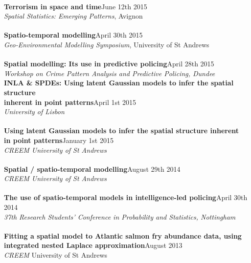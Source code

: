 \documentclass[10pt,letter]{article}
\begin{document}
 \hdashrule[0.5ex]{4cm}{1pt}{1pt}\\
{\textbf{Terrorism in space and time}}\hfill June 12th 2015\\
 {\sl Spatial Statistics: Emerging Patterns}, Avignon\\
 \hdashrule[0.5ex]{4cm}{1pt}{1pt}\\
 {\textbf{Spatio-temporal modelling}}\hfill April 30th 2015\\
 {\sl Geo-Environmental Modelling Symposium}, University of St Andrews\\
 \hdashrule[0.5ex]{4cm}{1pt}{1pt}\\
{\textbf{Spatial modelling: Its use in predictive policing}}\hfill April 28th 2015\\
{\sl Workshop on Crime Pattern Analysis and Predictive Policing, Dundee}\\
{\textbf{INLA \& SPDEs: Using latent Gaussian models to infer the spatial structure \\
inherent in point patterns}}\hfill April 1st 2015\\
 {\sl University of Lisbon}\\
 \hdashrule[0.5ex]{4cm}{1pt}{1pt}\\
 {\textbf{Using latent Gaussian models to infer the spatial
structure inherent \\in point patterns}}\hfill January 1st 2015\\
 {\sl CREEM University of St Andrews}\\
 \hdashrule[0.5ex]{4cm}{1pt}{1pt}\\
 {\textbf{Spatial / spatio-temporal modelling}}\hfill August 29th 2014\\
 {\sl CREEM University of St Andrews}\\
 \hdashrule[0.5ex]{4cm}{1pt}{1pt}\\
{\textbf{The use of spatio-temporal models in intelligence-led policing}}\hfill  April 30th 2014\\
 {\sl 37th Research Students' Conference in Probability and Statistics, Nottingham}\\
 \hdashrule[0.5ex]{4cm}{1pt}{1pt}\\
{\textbf{Fitting a spatial model to Atlantic salmon fry abundance data, using\\ integrated nested Laplace approximation}}\hfill  August 2013\\
 {\sl CREEM} University of St Andrews\\ 
\end{document}

